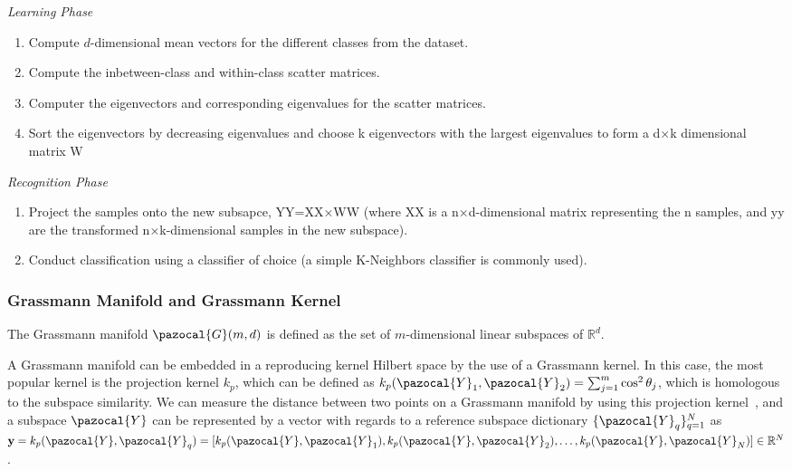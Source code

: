 {\setlength{\parindent}{0cm} \vspace{5mm}

\emph{Learning Phase}

\begin{enumerate}
    \item Compute $d$-dimensional mean vectors for the different classes from the dataset.
    \item Compute the inbetween-class and within-class scatter matrices.
    \item Computer the eigenvectors and corresponding eigenvalues for the scatter matrices.
    \item Sort the eigenvectors by decreasing eigenvalues and choose k eigenvectors with the largest eigenvalues to form a d×k dimensional matrix W
\end{enumerate}

\emph{Recognition Phase}

\begin{enumerate}
        \item Project the samples onto the new subsapce, YY=XX×WW (where XX is a n×d-dimensional matrix representing the n samples, and yy are the transformed n×k-dimensional samples in the new subspace).
        \item Conduct classification using a classifier of choice (a simple K-Neighbors classifier is commonly used).
\end{enumerate}


\subsubsection{Grassmann Manifold and Grassmann Kernel}

The Grassmann manifold $\pazocal{G}(m, d)$ is defined as the set of $m$-dimensional linear subspaces of $\mathbb{R}^{d}$. 


A Grassmann manifold can be embedded in a reproducing kernel Hilbert space by the use of a Grassmann kernel. In this case, the most popular kernel is the projection kernel $k_{p}$, which can be defined as $k_{p}(\pazocal{Y}_{1},\pazocal{Y}_{2}) = \sum_{j=1}^{m} \cos^{2} \theta_{j}$, which is homologous to the subspace similarity.
We can measure the distance between two points on a Grassmann manifold by using this projection kernel~\cite{hamm2008thesis}, and a subspace $\pazocal{Y}$ can be represented by a vector with regards to a reference subspace dictionary $\{\pazocal{Y}_{q}\}_{q=1}^{N}$ as $\mathbf{y} = k_{p}(\pazocal{Y},\pazocal{Y}_{q}) = [k_{p}(\pazocal{Y},\pazocal{Y}_{1}),k_{p}(\pazocal{Y},\pazocal{Y}_{2}),\ldots,k_{p}(\pazocal{Y},\pazocal{Y}_{N})] \in \mathbb{R}^{N}$.

}
